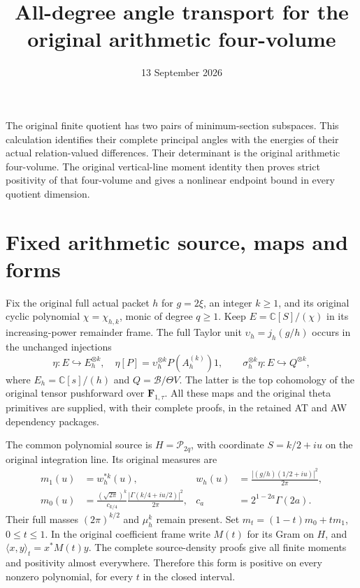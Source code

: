 \documentclass[11pt]{article}
\title{All-degree angle transport for the original arithmetic four-volume}
\author{}
\date{13 September 2026}
\newcommand{\C}{\mathbb C}
\newcommand{\cP}{\mathcal P}
\begin{document}
\maketitle

The original finite quotient has two pairs of minimum-section subspaces.
This calculation identifies their complete principal angles with the
energies of their actual relation-valued differences. Their determinant
is the original arithmetic four-volume. The original vertical-line
moment identity then proves strict positivity of that four-volume and
gives a nonlinear endpoint bound in every quotient dimension.

\section{Fixed arithmetic source, maps and forms}

Fix the original full actual packet $h$ for $g=2\xi$, an integer
$k\ge1$, and its original cyclic polynomial $\chi=\chi_{h,k}$,
monic of degree $q\ge1$. Keep $E=\C[S]/(\chi)$ in its
increasing-power remainder frame. The full Taylor unit
$\upsilon_h=j_h(g/h)$ occurs in the unchanged injections
\[
 \eta:E\hookrightarrow E_h^{\otimes k},\quad
 \eta[P]=\upsilon_h^{\otimes k}P(A_h^{(k)})1,
 \qquad \sigma_h^{\otimes k}\eta:E\hookrightarrow Q^{\otimes k},
 \tag{AGT1}
\]
where $E_h=\C[s]/(h)$ and $Q=\mathscr B/\Theta V$.
The latter is the top cohomology of the original tensor pushforward
over $\mathbf F_{1,\tau}$. All these maps and the original theta
primitives are supplied, with their complete proofs, in the retained
AT and AW dependency packages.

The common polynomial source is $H=\cP_{2q}$, with coordinate
$S=k/2+iu$ on the original integration line. Its original measures
are
\[
 \begin{aligned}
 m_1(u)&=w_h^{*k}(u),&
 w_h(u)&=\frac{|(g/h)(1/2+iu)|^2}{2\pi},\\
 m_0(u)&=\frac{(\sqrt{2\pi})^k}{c_{k/4}}
       \frac{|\Gamma(k/4+iu/2)|^2}{2\pi},&
 c_a&=2^{1-2a}\Gamma(2a).
 \end{aligned}
 \tag{AGT2}
\]
Their full masses $(2\pi)^{k/2}$ and $\mu_h^k$ remain present.
Set $m_t=(1-t)m_0+tm_1$, $0\le t\le1$. In the original coefficient
frame write $M(t)$ for its Gram on $H$, and
$\langle x,y\rangle_t=x^*M(t)y$.
The complete source-density proofs give all finite moments and
positivity almost everywhere. Therefore this form is positive on
every nonzero polynomial, for every $t$ in the closed interval.
\end{document}
